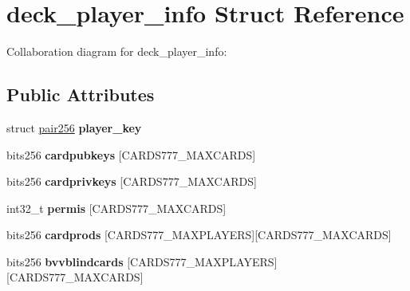 \hypertarget{structdeck__player__info}{}\section{deck\+\_\+player\+\_\+info Struct Reference}
\label{structdeck__player__info}


Collaboration diagram for deck\+\_\+player\+\_\+info\+:
\subsection*{Public Attributes}
\begin{DoxyCompactItemize}
\item 
\mbox{\label{structdeck__player__info_a69c860bb618326b42649fb8dc874b19a}} 
struct \hyperlink{structpair256}{pair256} {\bfseries player\+\_\+key}
\item 
\mbox{\label{structdeck__player__info_a42b58a3d6acbef59ef0951a2b441c1cd}} 
bits256 {\bfseries cardpubkeys} \mbox{[}C\+A\+R\+D\+S777\+\_\+\+M\+A\+X\+C\+A\+R\+DS\mbox{]}
\item 
\mbox{\label{structdeck__player__info_aace068630cb6fbc45a944df6d533e91e}} 
bits256 {\bfseries cardprivkeys} \mbox{[}C\+A\+R\+D\+S777\+\_\+\+M\+A\+X\+C\+A\+R\+DS\mbox{]}
\item 
\mbox{\label{structdeck__player__info_a3627ccd09a0aeedd9e72dcd69186181b}} 
int32\+\_\+t {\bfseries permis} \mbox{[}C\+A\+R\+D\+S777\+\_\+\+M\+A\+X\+C\+A\+R\+DS\mbox{]}
\item 
\mbox{\label{structdeck__player__info_afe50d0d657541e924497e3e16765abf9}} 
bits256 {\bfseries cardprods} \mbox{[}C\+A\+R\+D\+S777\+\_\+\+M\+A\+X\+P\+L\+A\+Y\+E\+RS\mbox{]}\mbox{[}C\+A\+R\+D\+S777\+\_\+\+M\+A\+X\+C\+A\+R\+DS\mbox{]}
\item 
\mbox{\label{structdeck__player__info_a8c853de455fc2b5289789287a025cb05}} 
bits256 {\bfseries bvvblindcards} \mbox{[}C\+A\+R\+D\+S777\+\_\+\+M\+A\+X\+P\+L\+A\+Y\+E\+RS\mbox{]}\mbox{[}C\+A\+R\+D\+S777\+\_\+\+M\+A\+X\+C\+A\+R\+DS\mbox{]}
\item 
\mbox{\label{structdeck__player__info_addcc08f5394486871a4fbec618c84df9}} 

\end{DoxyCompactItemize}
